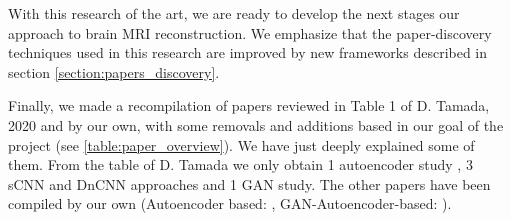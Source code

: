 

With this research of the art, we are ready to develop the next stages our approach to brain MRI reconstruction. We emphasize that the paper-discovery techniques used in this research are improved by new frameworks described in section \ref{section:papers_discovery}.

Finally, we made a recompilation of papers reviewed in Table 1 of D. Tamada, 2020 \cite{tamada2020review} and by our own, with some removals and additions based in our goal of the project (see \ref{table:paper_overview}). We have just deeply explained some of them. From the table of D. Tamada we only obtain 1 autoencoder study \cite{bermudez2018t1autoencoder}, 3 sCNN and DnCNN approaches \cite{kidoh2019scnnt1} \cite{ganHR3d} \cite{dncnnnoise2noise} and 1 GAN study.  The other papers have been compiled by our own (Autoencoder based: \cite{pinaya2019} \cite{myronenko20183d} \cite{gondara2016medicalautoencoder} \cite{superresolution} \cite{fuzzyautoencoder} \cite{learnvolrepreCODE}, GAN-Autoencoder-based: \cite{wganautoencoder}).



